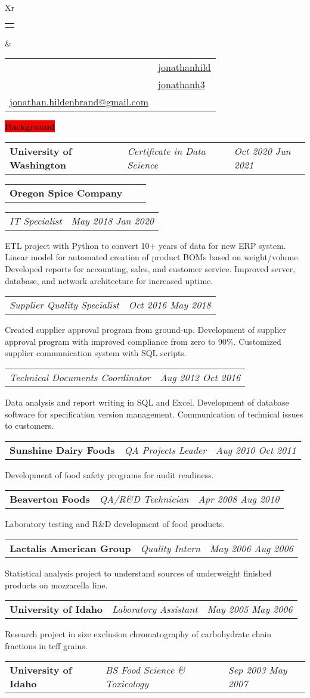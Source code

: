 \documentclass[letterpaper,12pt]{article}[leftmargin=*]
\makeatletter
\def\fullname{Jonathan Hildenbrand}
\def\githubicon{\faGithub}
\def\githublink{https://github.com/jonathanhild}
\def\githubtext{jonathanhild}
\def\linkedinicon{\faLinkedin}
\def\linkedinlink{https://linkedin.com/in/jonathanh3}
\def\linkedintext{jonathanh3}
\def\phoneicon{\faPhone}
\def\phonetext{+1-971-409-0695}
\def\emailicon{\faEnvelope}
\def\emaillink{mailto:jonathan.hildenbrand+resume@gmail.com}
\def\emailtext{jonathan.hildenbrand@gmail.com}
\def\locationicon{\faMapMarker}
\def\locationtext{Portland, Oregon}
\def\targeticon{\faBinoculars}
\def\targettext{Local \& Remote}
\def\headertype{\doublecol} %
\def\location{\hspace{3pt}\locationicon \hspace{5pt}{\color{links}\locationtext}}
\def\target{\targeticon\hspace{3pt}{\color{links}\targettext}}
\def\phone{\phoneicon\hspace{3pt}{\color{links}{\phonetext}}}
\def\linkedin{\linkedinicon\hspace{3pt}\href{\linkedinlink}{\underline{\linkedintext}}}
\def\email{\emailicon\hspace{3pt}\href{\emaillink}{\underline{\emailtext}}}
\def\github{\githubicon\hspace{3pt}\href{\githublink}{\underline{\githubtext}}}
\newcommand{\background}[2]{\vspace{4pt}
  \colorbox{Red}{\color{white}#1\hspace{9pt}\raggedbottom\normalsize\textbf{#2\hspace{4pt}}}
}
\newcommand{\skills}[2]{\vspace{4pt}
  \colorbox{Green}{\color{white}#1\hspace{9pt}\raggedbottom\normalsize\textbf{#2\hspace{4pt}}}
}
\newcommand{\resumeSectionStart}{\begin{itemize}[leftmargin=0.1in]}
\newcommand{\resumeSectionEnd}{\end{itemize}}
\newcommand{\resumeExperience}[3]{
  \item[]
    \begin{tabularx}{0.97\textwidth}{>{\raggedright}X >{\raggedright\arraybackslash}X >{\raggedleft\arraybackslash}X}
      \textbf{\faTable\color{primary}\hspace{10px}#1} & \textit{\color{accent}#2} & \textit{\color{accent}\small#3} \\
  \end{tabularx}
   \vspace{-6pt}
   
}
\newcommand{\resumeSubExperience}[2]{
  \begin{tabularx}{0.97\textwidth}{>{\raggedright\arraybackslash}X >{\raggedleft}X}
    \textit{\color{accent}#1} & \textit{\color{accent}\small#2}
  \end{tabularx}
}
\newcommand{\resumeEducation}[3]{
  \item[]
    \begin{tabularx}{0.97\textwidth}[t]{>{\raggedright}X >{\raggedright\arraybackslash}X >{\raggedleft\arraybackslash}X}
      \textbf{\faGraduationCap\color{primary}\hspace{6px}#1} & \textit{\color{accent}#2} & \textit{\color{accent}\small#3} \\
    \end{tabularx}
    \vspace{-6pt}
}
\newcommand{\doublecol}[6]{
  \begin{tabularx}{\textwidth}{Xr}
    {
      \begin{tabular}[c]{l}
        \fontsize{24}{34}\selectfont{\color{primary}{{\textbf{\fullname}}}}
      \end{tabular}
    } & {
      \begin{tabular}[c]{l@{\hspace{1.5em}} l}
        {\small#4} & {\small#1} \\
        {\small#5} & {\small#2} \\
        {\small#6} & {\small#3}
      \end{tabular}
    }
  \end{tabularx}
}
\newcommand{\singlecol}[6]{
  \begin{tabularx}{\textwidth}{Xr}
    {
      \begin{tabular}[b]{l}
        \fontsize{35}{45}\selectfont{\color{primary}{{\textbf{\fullname}}}} \\
        {\textit{\subtitle}} %
      \end{tabular}
    } & {
      \begin{tabular}[c]{l}
        {\small#1} \\
        {\small#2} \\
        {\small#3} \\
        {\small#4} \\
        {\small#5} \\
        {\small#6}
      \end{tabular}
    }
  \end{tabularx}
}
\makeatother
\begin{document}
\headertype{\github}{\linkedin}{\phone}{\location}{\target}{\email} %


\background{\faUser}{Background}
\resumeSectionStart{\resumeEducation{University of Washington}{Certificate in Data Science}{Oct 2020 \textemdash{} Jun 2021}}\resumeSectionEnd{}
\resumeSectionStart{\resumeExperience{Oregon Spice Company}{}{}
  \resumeSubExperience{IT Specialist}{May 2018 \textemdash{} Jan 2020}ETL project with Python to convert 10+ years of data for new ERP system. Linear model for automated creation of product BOMs based on weight/volume. Developed reports for accounting, sales, and customer service. Improved server, database, and network architecture for increased uptime.
  \resumeSubExperience{Supplier Quality Specialist}{Oct 2016 \textemdash{} May 2018}Created supplier approval program from ground-up. Development of supplier approval program with improved compliance from zero to 90\%. Customized supplier communication system with SQL scripts.
  \resumeSubExperience{Technical Documents Coordinator}{Aug 2012 \textemdash{} Oct 2016}Data analysis and report writing in SQL and Excel. Development of database software for specification version management. Communication of technical issues to customers.}\resumeSectionEnd{}
\resumeSectionStart{\resumeExperience{Sunshine Dairy Foods}{QA Projects Leader}{Aug 2010 \textemdash{} Oct 2011}Development of food safety programs for audit readiness.}\resumeSectionEnd{}
\resumeSectionStart{\resumeExperience{Beaverton Foods}{QA/R\&D Technician}{Apr 2008 \textemdash{} Aug 2010}Laboratory testing and R\&D development of food products.}\resumeSectionEnd{}
\resumeSectionStart{\resumeExperience{Lactalis American Group}{Quality Intern}{May 2006 \textemdash{} Aug 2006}Statistical analysis project to understand sources of underweight finished products on mozzarella line.}\resumeSectionEnd{}
\resumeSectionStart{\resumeExperience{University of Idaho}{Laboratory Assistant}{May 2005 \textemdash{} May 2006}Research project in size exclusion chromatography of carbohydrate chain fractions in teff grains.}
\resumeEducation{University of Idaho}{BS Food Science \& Toxicology}{Sep 2003 \textemdash{} May 2007}
\resumeSectionEnd{}


\end{document}
